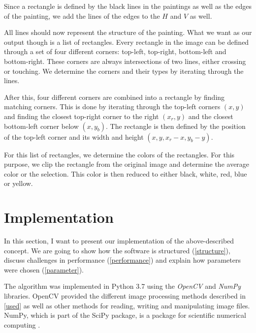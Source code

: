 \documentclass[serif,article,noparskip]{agse-thesis}
\begin{document}
Since a rectangle is defined by the black lines in the paintings as well as the
edges of the painting, we add the lines of the edges to the $H$ and $V$ as well.


All lines should now represent the structure of the painting. What we want as
our output though is a list of rectangles. Every rectangle in the image can be
defined through a set of four different corners: top-left, top-right,
bottom-left and bottom-right. These corners are always intersections of two
lines, either crossing or touching. We determine the corners and their types by
iterating through the lines.

After this, four different corners are combined into a rectangle by finding
matching corners. This is done by iterating through the top-left corners $(x,y)$
and finding the closest top-right corner to the right $(x_r, y)$ and the
closest bottom-left corner below $(x, y_b)$. The rectangle is then defined by
the position of the top-left corner and its width and height
$(x,y,x_r-x,y_b-y)$.

For this list of rectangles, we determine the colors of the rectangles. For this
purpose, we clip the rectangle from the original image and determine the average
color or the selection. This color is then reduced to either black, white, red,
blue or yellow.

\section{Implementation} \label{implementation}

In this section, I want to present our implementation of the above-described
concept. We are going to show how the software is structured
(\ref{structure}), discuss challenges in performance (\ref{performance}) and
explain how parameters were chosen (\ref{parameter}).

The algorithm was implemented in Python 3.7 using the \textit{OpenCV} and
\textit{NumPy} libraries. OpenCV provided the different image processing methods
described in \ref{used} as well as other methods for reading, writing and
manipulating image files. NumPy, which is part of the SciPy package, is a
package for scientific numerical computing \cite{scipy}.
\end{document}
